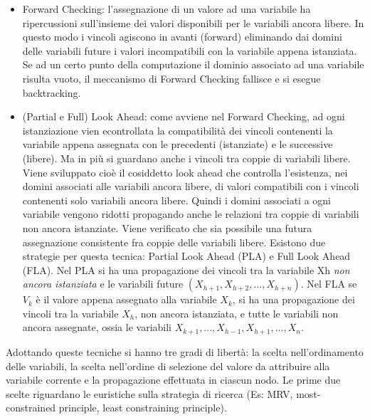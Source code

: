 \documentclass[answers, a4paper, 11pt]{exam}
\begin{document}
\begin{questions}
\begin{solution}
  \begin{itemize}

    \item Forward Checking: l'assegnazione di un valore ad una variabile ha ripercussioni sull'insieme dei valori disponibili per le variabili ancora libere. In questo modo i vincoli agiscono in avanti (forward) eliminando dai domini delle variabili future i valori incompatibili con la variabile appena istanziata. Se ad un certo punto della computazione il dominio associato ad una variabile risulta vuoto, il meccanismo di Forward Checking fallisce e si esegue backtracking.

    \item (Partial e Full) Look Ahead: come avviene nel Forward Checking, ad ogni istanziazione vien econtrollata la compatibilità dei vincoli contenenti la variabile appena assegnata con le precedenti (istanziate) e le successive (libere). Ma in più si guardano anche i vincoli tra coppie di variabili libere. Viene sviluppato cioè il cosiddetto look ahead che controlla l'esistenza, nei domini associati alle variabili ancora libere, di valori compatibili con i vincoli contenenti solo variabili ancora libere.
Quindi i domini associati a ogni variabile vengono ridotti propagando anche le relazioni tra coppie di variabili non ancora istanziate. Viene verificato che sia possibile una futura assegnazione consistente fra coppie delle variabili libere.
      Esistono due strategie per questa tecnica: Partial Look Ahead (PLA) e Full Look Ahead (FLA). Nel PLA si ha una propagazione dei vincoli tra la variabile Xh \emph{non ancora istanziata} e le variabili future $(X_{h+1}, X_{h+2},...,X_{h+n})$. 
      Nel FLA se $V_k$ è il valore appena assegnato alla variabile $X_k$, si ha una propagazione dei vincoli tra la variabile $X_h$, non ancora istanziata, e tutte le variabili non ancora assegnate, ossia le variabili $X_{k+1},...,X_{h-1},X_{h+1},...,X_n$.
  \end{itemize}
Adottando queste tecniche si hanno tre gradi di libertà: la scelta nell'ordinamento delle variabili, la scelta nell'ordine di selezione del valore da attribuire alla variabile corrente e la propagazione effettuata in ciascun nodo. Le prime due scelte riguardano le euristiche sulla strategia di ricerca (Es: MRV, most-constrained principle, least constraining principle).


\end{solution}


\end{questions}
\end{document}
